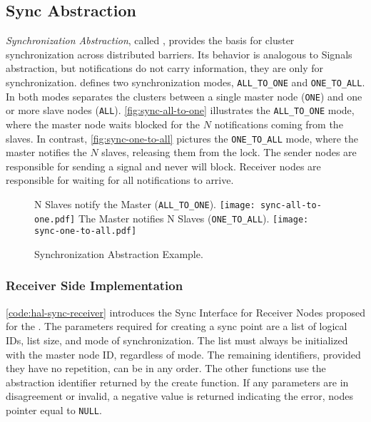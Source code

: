 
		\subsection{Sync Abstraction}
		\label{sec.sync-abs}

			\textit{Synchronization Abstraction}, called \sync, provides the
			basis for cluster synchronization across distributed barriers.
			Its behavior is analogous to \posix Signals abstraction, but
			notifications do not carry information, they are only for synchronization.
			\sync defines two synchronization modes, \texttt{ALL\_TO\_ONE} and
			\texttt{ONE\_TO\_ALL}. In both modes separates the clusters between
			a single master node (\texttt{ONE}) and one or more slave nodes
			(\texttt{ALL}). \autoref{fig:sync-all-to-one} illustrates the
			\texttt{ALL\_TO\_ONE} mode, where the master node waits blocked for
			the $N$ notifications coming from the slaves. In contrast,
			\autoref{fig:sync-one-to-all} pictures the \texttt{ONE\_TO\_ALL} mode,
			where the master notifies the $N$ slaves, releasing them from the lock.
			The sender nodes are responsible for sending a signal and never will
			block. Receiver nodes are responsible for waiting for all notifications
			to arrive.

			\begin{figure}[!tb]
				\centering%
				\caption{Synchronization Abstraction Example.}%
				\label{fig:sync-concepts}%

					{N Slaves notify the Master (\texttt{ALL\_TO\_ONE}).}%
					{\texttt{[image: sync-all-to-one.pdf]}}%
				\hspace{1cm}%
					{The Master notifies N Slaves (\texttt{ONE\_TO\_ALL}).}%
					{\texttt{[image: sync-one-to-all.pdf]}}%

			\end{figure}

			\subsubsection{Receiver Side Implementation}

				\autoref{code:hal-sync-receiver} introduces the Sync Interface for
				Receiver Nodes proposed for the \nanvix \hal. The parameters required
				for creating a sync point are a list of logical IDs, list size,
				and mode of synchronization. The list must always be initialized
				with the master node ID, regardless of mode. The remaining identifiers,
				provided they have no repetition, can be in any order. The other
				functions use the abstraction identifier returned by the create
				function. If any parameters are in disagreement or invalid, a
				negative value is returned indicating the error, \eg nodes pointer
				equal to \texttt{NULL}.

